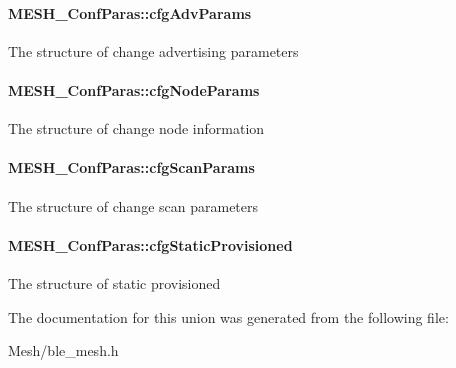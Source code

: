 \paragraph[{\texorpdfstring{cfg\+Adv\+Params}{cfgAdvParams}}]{ M\+E\+S\+H\+\_\+\+Conf\+Paras\+::cfg\+Adv\+Params}\hypertarget{union_m_e_s_h___conf_paras_a3d3d55eb231ca0036bb3aa53801bc001}{}\label{union_m_e_s_h___conf_paras_a3d3d55eb231ca0036bb3aa53801bc001}
The structure of change advertising parameters 
\paragraph[{\texorpdfstring{cfg\+Node\+Params}{cfgNodeParams}}]{ M\+E\+S\+H\+\_\+\+Conf\+Paras\+::cfg\+Node\+Params}\hypertarget{union_m_e_s_h___conf_paras_adb1eed0912b6181a43c70ffc4d8c3427}{}\label{union_m_e_s_h___conf_paras_adb1eed0912b6181a43c70ffc4d8c3427}
The structure of change node information 
\paragraph[{\texorpdfstring{cfg\+Scan\+Params}{cfgScanParams}}]{ M\+E\+S\+H\+\_\+\+Conf\+Paras\+::cfg\+Scan\+Params}\hypertarget{union_m_e_s_h___conf_paras_aeb8868051d71109967492ec34057f804}{}\label{union_m_e_s_h___conf_paras_aeb8868051d71109967492ec34057f804}
The structure of change scan parameters 
\paragraph[{\texorpdfstring{cfg\+Static\+Provisioned}{cfgStaticProvisioned}}]{ M\+E\+S\+H\+\_\+\+Conf\+Paras\+::cfg\+Static\+Provisioned}\hypertarget{union_m_e_s_h___conf_paras_a910afc4956d3b2e20e6f004627e4349f}{}\label{union_m_e_s_h___conf_paras_a910afc4956d3b2e20e6f004627e4349f}
The structure of static provisioned 

The documentation for this union was generated from the following file\+:\begin{DoxyCompactItemize}
\item 
Mesh/ble\+\_\+mesh.\+h\end{DoxyCompactItemize}
